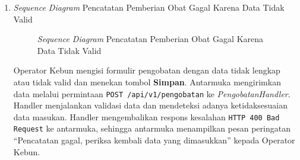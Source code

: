 \documentclass[a4paper,11pt]{article}
\begin{document}
\begin{enumerate}
    \textbf{Penjelasan Alur:}
    \begin{itemize}
        \item \textbf{Aksi Awal:} Operator mengisi form pemberian obat. Antarmuka menarik data rekomendasi dosis otomatis dari backend.
        \item \textbf{Alur Backend:} Operator menekan \textbf{Simpan}. Antarmuka mengirim request \texttt{POST /api/v1/pengobatan} diikuti pengurangan stok \texttt{PATCH /api/v1/stok/obat/:id}.
        \item \textbf{Akses Data:} Usecase menyimpan log pengobatan baru dan usecase stok memperbarui sisa volume obat di database.
        \item \textbf{Output:} Catatan tersimpan dengan sukses dan stok obat di gudang ter-depresiasi.
    \end{itemize}

    \item \textit{Sequence Diagram} Pencatatan Pemberian Obat Gagal Karena Data Tidak Valid
    \begin{figure}[H]
        \centering
        \caption{\textit{Sequence Diagram} Pencatatan Pemberian Obat Gagal Karena Data Tidak Valid}
        \label{fig:sd-pengobatan-invalid}
    \end{figure}

    \hspace{1em} Operator Kebun mengisi formulir pengobatan dengan data tidak lengkap atau tidak valid dan menekan tombol \textbf{Simpan}. Antarmuka mengirimkan data melalui permintaan \texttt{POST /api/v1/pengobatan} ke \textit{PengobatanHandler}. Handler menjalankan validasi data dan mendeteksi adanya ketidaksesuaian data masukan. Handler mengembalikan respons kesalahan \texttt{HTTP 400 Bad Request} ke antarmuka, sehingga antarmuka menampilkan pesan peringatan ``Pencatatan gagal, periksa kembali data yang dimasukkan'' kepada Operator Kebun.


\end{enumerate}
\end{document}
